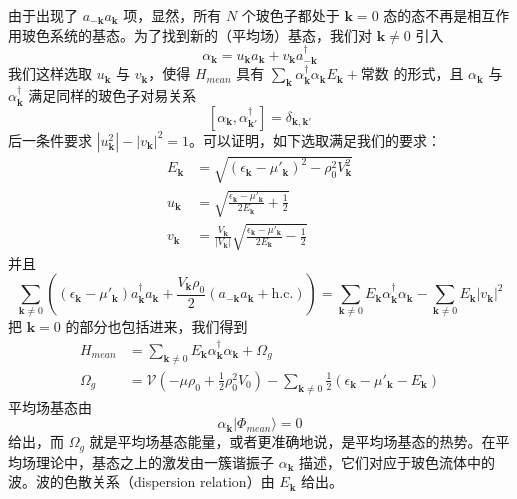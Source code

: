由于出现了 $a_{-\pmb{k}}a_{\pmb{k}}$ 项，显然，所有 $N$ 个玻色子都处于 $\pmb{k}=0$ 态的态不再是相互作用玻色系统的基态。为了找到新的（平均场）基态，我们对 $\pmb{k}\neq0$ 引入
\begin{equation*}
\alpha_{\pmb{k}}=u_{\pmb{k}}a_{\pmb{k}}+v_{\pmb{k}}a_{-\pmb{k}}^{\dagger}
\end{equation*}
我们这样选取 $u_{\pmb{k}}$ 与 $v_{\pmb{k}}$，使得 $H_{mean}$ 具有 $\sum_{\pmb{k}}\alpha_{\pmb{k}}^{\dagger}\alpha_{\pmb{k}}E_{\pmb{k}}+\text{常数}$ 的形式，且 $\alpha_{\pmb{k}}$ 与 $\alpha_{\pmb{k}}^{\dagger}$ 满足同样的玻色子对易关系
\begin{equation*}
\left[\alpha_{\pmb{k}},\alpha_{\pmb{k}'}^{\dagger}\right]=\delta_{\pmb{k},\pmb{k}'}
\end{equation*}
后一条件要求 $|u_{\pmb{k}}^2|-|v_{\pmb{k}}|^2=1$。可以证明，如下选取满足我们的要求：
\begin{align*}
E_{\pmb{k}}&=\sqrt{(\epsilon_{\pmb{k}}-\mu'_{\pmb{k}})^2-\rho_0^2V_{\pmb{k}}^2}\tag{3.2.3}\\
u_{\pmb{k}}&=\sqrt{\frac{\epsilon_{\pmb{k}}-\mu'_{\pmb{k}}}{2E_{\pmb{k}}}+\frac{1}{2}}\tag{3.2.4}\\
v_{\pmb{k}}&=\frac{V_{\pmb{k}}}{|V_{\pmb{k}}|}\sqrt{\frac{\epsilon_{\pmb{k}}-\mu'_{\pmb{k}}}{2E_{\pmb{k}}}-\frac{1}{2}}\tag{3.2.5}
\end{align*}
并且
\begin{equation*}
\sum_{\pmb{k}\neq0}\left((\epsilon_{\pmb{k}}-\mu'_{\pmb{k}})a_{\pmb{k}}^{\dagger}a_{\pmb{k}}+\frac{V_{\pmb{k}}\rho_0}{2}\left(a_{-\pmb{k}}a_{\pmb{k}}+\text{h.c.}\right)\right)=\sum_{\pmb{k}\neq0}E_{\pmb{k}}\alpha_{\pmb{k}}^{\dagger}\alpha_{\pmb{k}}-\sum_{\pmb{k}\neq0}E_{\pmb{k}}|v_{\pmb{k}}|^2
\end{equation*}
把 $\pmb{k}=0$ 的部分也包括进来，我们得到
\begin{align*}
H_{mean}&=\sum_{\pmb{k}\neq0}E_{\pmb{k}}\alpha_{\pmb{k}}^{\dagger}\alpha_{\pmb{k}}+\Omega_g\\
\Omega_g&=\mathcal{V}\left(-\mu\rho_0+\frac{1}{2}\rho_0^2V_0\right)-\sum_{\pmb{k}\neq0}\frac{1}{2}(\epsilon_{\pmb{k}}-\mu'_{\pmb{k}}-E_{\pmb{k}})
\end{align*}
平均场基态由
\begin{equation*}
\alpha_{\pmb{k}}|\Phi_{mean}\rangle=0
\end{equation*}
给出，而 $\Omega_g$ 就是平均场基态能量，或者更准确地说，是平均场基态的热势。在平均场理论中，基态之上的激发由一簇谐振子 $\alpha_{\pmb{k}}$ 描述，它们对应于玻色流体中的波。波的色散关系（dispersion relation）由 $E_{\pmb{k}}$ 给出。

